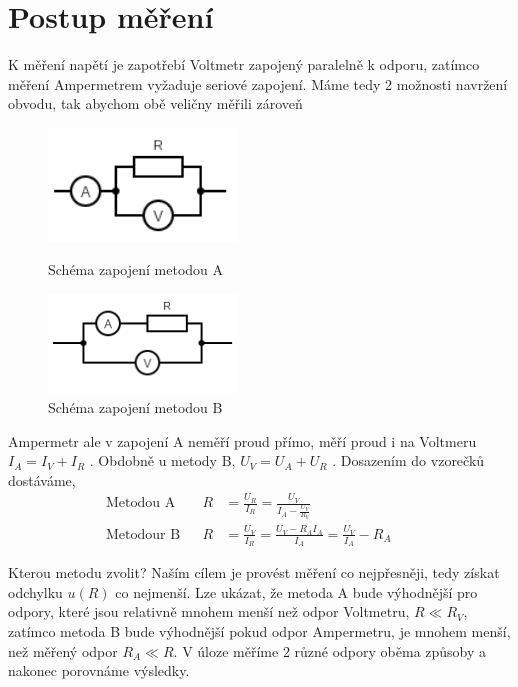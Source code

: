 \documentclass[a4paper,11pt]{article}
\begin{document}
\section{Postup měření} 

K měření napětí je zapotřebí Voltmetr zapojený paralelně k odporu, zatímco měření Ampermetrem vyžaduje seriové zapojení.
Máme tedy 2 možnosti navržení obvodu, tak abychom obě veličny měřili zároveň

\begin{figure}[htbp]
  \begin{minipage}[t]{0.45\textwidth}
    \centering
    \includegraphics[width=5cm]{circuitA.png}
    \caption{Schéma zapojení metodou A}%
  \end{minipage}
  \hfil
  \begin{minipage}[t]{0.45\textwidth}
    \centering
    \includegraphics[width=5cm]{circuitB.png}
    \caption{Schéma zapojení metodou B}%
  \end{minipage}
\end{figure}

Ampermetr ale v zapojení A neměří proud přímo, měří proud i na Voltmeru $I_A = I_V + I_R$ . 
Obdobně u metody B, $U_V = U_A + U_R$ . Dosazením do vzorečků dostáváme, \\

\begin{align}
  \label{eq:2}
  \text{Metodou A} & & R &= \frac{U_R}{I_R} = \frac{U_V}{I_A - \frac{U_V}{R_V}} & & \\[5pt]
  \label{eq:3}
  \text{Metodour B} & & R &= \frac{U_V}{I_R} = \frac{U_V - R_AI_A}{I_A} = \frac{U_V}{I_A} - R_A & &
\end{align}

Kterou metodu zvolit? Naším cílem je provést měření co nejpřesněji, tedy získat odchylku $u(R)$ co nejmenší.
Lze ukázat, že metoda A bude výhodnější pro odpory, které jsou relativně mnohem menší než odpor Voltmetru, $R \ll R_V$, 
zatímco metoda B bude výhodnější pokud odpor Ampermetru, je mnohem menší, než měřený odpor $R_A \ll R$. 
V úloze měříme 2 různé odpory oběma způsoby a nakonec porovnáme výsledky. \\
\end{document}
